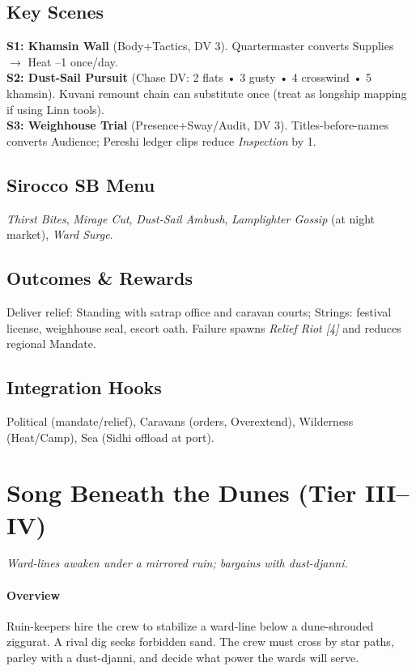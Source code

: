\documentclass[11pt]{article}
\begin{document}
\subsection*{Key Scenes}
\textbf{S1: Khamsin Wall} (Body+Tactics, DV 3). Quartermaster converts Supplies $\rightarrow$ Heat --1 once/day. \\
\textbf{S2: Dust-Sail Pursuit} (Chase DV: 2 flats • 3 gusty • 4 crosswind • 5 khamsin). Kuvani remount chain can substitute once (treat as longship mapping if using Linn tools). \\
\textbf{S3: Weighhouse Trial} (Presence+Sway/Audit, DV 3). Titles-before-names converts Audience; Pereshi ledger clips reduce \emph{Inspection} by 1.

\subsection*{Sirocco SB Menu}
\emph{Thirst Bites}, \emph{Mirage Cut}, \emph{Dust-Sail Ambush}, \emph{Lamplighter Gossip} (at night market), \emph{Ward Surge}.

\subsection*{Outcomes \& Rewards}
Deliver relief: Standing with satrap office and caravan courts; Strings: festival license, weighhouse seal, escort oath. Failure spawns \emph{Relief Riot [4]} and reduces regional Mandate.

\subsection*{Integration Hooks}
Political (mandate/relief), Caravans (orders, Overextend), Wilderness (Heat/Camp), Sea (Sidhi offload at port).

\section*{Song Beneath the Dunes (Tier III--IV)}
\textit{Ward-lines awaken under a mirrored ruin; bargains with dust-djanni.}

\paragraph{Overview} Ruin-keepers hire the crew to stabilize a ward-line below a dune-shrouded ziggurat. A rival dig seeks forbidden sand. The crew must cross by star paths, parley with a dust-djanni, and decide what power the wards will serve.
\end{document}
